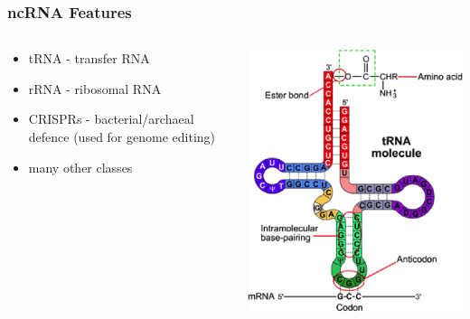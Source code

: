 \begin{frame}
  \frametitle{ncRNA Features}
  \begin{columns}[T]
    \begin{column}{5cm}
      \begin{itemize}
        \item tRNA - transfer RNA
        \item rRNA - ribosomal RNA
        \item CRISPRs - bacterial/archaeal defence (used for genome editing)
        \item many other classes
      \end{itemize}
    \end{column}
    \begin{column}{5cm}
      \includegraphics[width=1\textwidth]{images/ncrna}
    \end{column}
  \end{columns}       
\end{frame}

